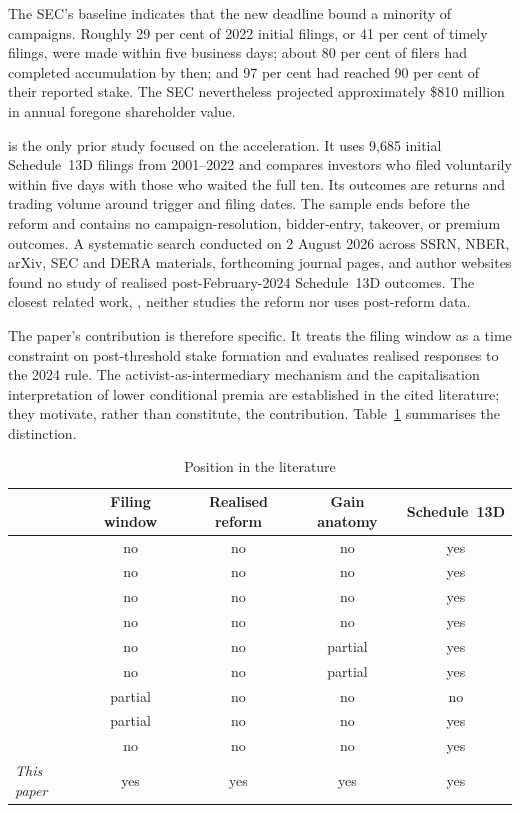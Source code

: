 The SEC's baseline indicates that the new deadline bound a minority of
campaigns. Roughly 29 per cent of 2022 initial filings, or 41 per cent of timely
filings, were made within five business days; about 80 per cent of filers had
completed accumulation by then; and 97 per cent had reached 90 per cent of their
reported stake. The SEC nevertheless projected approximately \$810 million in
annual foregone shareholder value.

\textcite{polk2024} is the only prior study focused on the acceleration. It uses
9{,}685 initial Schedule~13D filings from 2001--2022 and compares investors who
filed voluntarily within five days with those who waited the full ten. Its
outcomes are returns and trading volume around trigger and filing dates. The
sample ends before the reform and contains no campaign-resolution, bidder-entry,
takeover, or premium outcomes. A systematic search conducted on 2 August 2026
across SSRN, NBER, arXiv, SEC and DERA materials, forthcoming journal pages, and
author websites found no study of realised post-February-2024 Schedule~13D
outcomes. The closest related work, \textcite{celentanolevine2025}, neither
studies the reform nor uses post-reform data.

The paper's contribution is therefore specific. It treats the filing window as
a time constraint on post-threshold stake formation and evaluates realised
responses to the 2024 rule. The activist-as-intermediary mechanism and the
capitalisation interpretation of lower conditional premia are established in
the cited literature; they motivate, rather than constitute, the contribution.
Table~\ref{tab:position} summarises the distinction.

\begin{table}[t]
\centering
\footnotesize
\caption{Position in the literature}
\label{tab:position}
\begin{tabular}{@{}lcccc@{}}
\toprule
 & Filing window & Realised reform & Gain anatomy & Schedule~13D \\
\midrule\relax
\textcite{ordonezcalafibernhardt2022} & no      & no  & no      & yes \\\relax
\textcite{burkartlee2022}             & no      & no  & no      & yes \\\relax
\textcite{corumlevit2019}             & no      & no  & no      & yes \\\relax
\textcite{johnsonswem2021}            & no      & no  & no      & yes \\\relax
\textcite{albuquerquefosschroth2022}  & no      & no  & partial & yes \\\relax
\textcite{celentanolevine2025}        & no      & no  & partial & yes \\\relax
\textcite{bonettiduroormazabal2020}   & partial & no  & no      & no  \\\relax
\textcite{polk2024}                   & partial & no  & no      & yes \\\relax
\textcite{cetemen2026}                & no      & no  & no      & yes \\
\midrule
\emph{This paper}                     & yes     & yes & yes     & yes \\
\bottomrule
\end{tabular}
\end{table}
